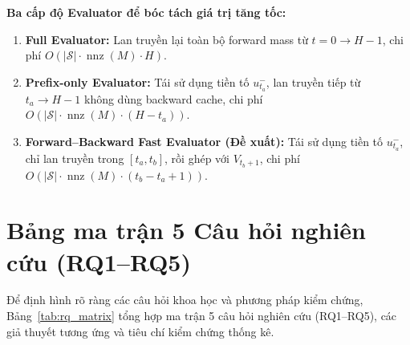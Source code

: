 \documentclass[12pt,a4paper]{article}
\begin{document}
\textbf{Ba cấp độ Evaluator để bóc tách giá trị tăng tốc:}
\begin{enumerate}
    \item \textbf{Full Evaluator:} Lan truyền lại toàn bộ forward mass từ $t=0 \to H-1$, chi phí $O(|\mathcal{S}| \cdot \operatorname{nnz}(M) \cdot H)$.
    \item \textbf{Prefix-only Evaluator:} Tái sử dụng tiền tố $u_{t_a}^-$, lan truyền tiếp từ $t_a \to H-1$ không dùng backward cache, chi phí $O(|\mathcal{S}| \cdot \operatorname{nnz}(M) \cdot (H - t_a))$.
    \item \textbf{Forward--Backward Fast Evaluator (Đề xuất):} Tái sử dụng tiền tố $u_{t_a}^-$, chỉ lan truyền trong $[t_a, t_b]$, rồi ghép với $V_{t_b+1}$, chi phí $O(|\mathcal{S}| \cdot \operatorname{nnz}(M) \cdot (t_b - t_a + 1))$.
\end{enumerate}

\section{Bảng ma trận 5 Câu hỏi nghiên cứu (RQ1--RQ5)}

Để định hình rõ ràng các câu hỏi khoa học và phương pháp kiểm chứng, Bảng~\ref{tab:rq_matrix} tổng hợp ma trận 5 câu hỏi nghiên cứu (RQ1--RQ5), các giả thuyết tương ứng và tiêu chí kiểm chứng thống kê.
\end{document}
